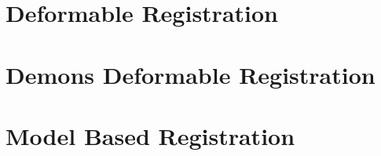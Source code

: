 \section{Deformable Registration}
\label{sec:DeformableRegistration}
\ifitkFullVersion

\fi

\section{Demons Deformable Registration}
\label{sec:DemonsDeformableRegistration}
\ifitkFullVersion

\fi


\section{Model Based Registration}
\label{sec:ModelBasedRegistration}
\ifitkFullVersion

\fi


